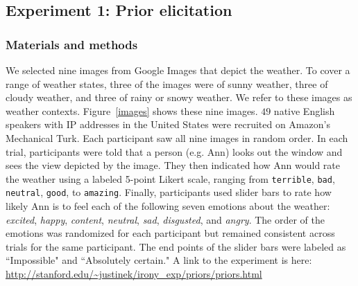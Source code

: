 \documentclass[10pt,letterpaper]{article}
\begin{document}




\subsection{Experiment 1: Prior elicitation}
\subsubsection{Materials and methods}
We selected nine images from Google Images that depict the weather. To cover a range of weather states, three of the images were of sunny weather, three of cloudy weather, and three of rainy or snowy weather. We refer to these images as weather contexts. Figure~\ref{images} shows these nine images.
$49$ native English speakers with IP addresses in the United States were recruited on Amazon's Mechanical Turk. Each participant saw all nine images in random order. In each trial, participants were told that a person (e.g. Ann) looks out the window and sees the view depicted by the image. They then indicated how Ann would rate the weather using a labeled 5-point Likert scale, ranging from \texttt{terrible}, \texttt{bad}, \texttt{neutral}, \texttt{good}, to \texttt{amazing}. Finally, participants used slider bars to rate how likely Ann is to feel each of the following seven emotions about the weather: \emph{excited}, \emph{happy}, \emph{content}, \emph{neutral}, \emph{sad}, \emph{disgusted}, and \emph{angry}.  The order of the emotions was randomized for each participant but remained consistent across trials for the same participant. The end points of the slider bars were labeled as ``Impossible" and ``Absolutely certain." A link to the experiment is here: \url{http://stanford.edu/~justinek/irony_exp/priors/priors.html}
  
\end{document}

